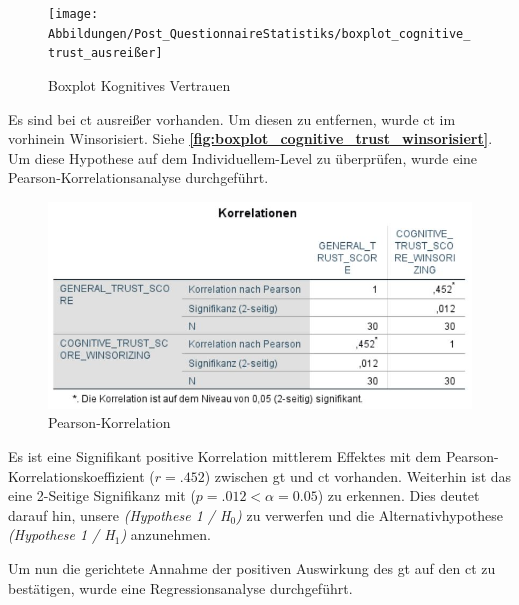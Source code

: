 \documentclass[a4paper,11pt]{article}%
\renewcommand{\\}{\vspace*{0.5\baselineskip} \newline}
\begin{document}
\begin{figure}[H]
\centering
		\begin{footnotesize}
			\texttt{[image: Abbildungen/Post\_QuestionnaireStatistiks/boxplot\_cognitive\_trust\_ausreißer]}\\
			\caption{Boxplot Kognitives Vertrauen}
			\label{fig:boxplot_cognitive_trust_ausreißer}
		\end{footnotesize}
	\end{figure}	

Es sind bei \ac{ct} ausreißer vorhanden. Um diesen zu entfernen, wurde \ac{ct} im vorhinein Winsorisiert. Siehe \textbf{\autoref{fig:boxplot_cognitive_trust_winsorisiert}}. 
Um diese Hypothese auf dem Individuellem-Level zu überprüfen, wurde eine Pearson-Korrelationsanalyse durchgeführt. 

\begin{figure}[H]
\centering
		\begin{footnotesize}
			\includegraphics[scale=0.8]{Abbildungen/Post_QuestionnaireStatistiks/pearson_korrelation_general_cognitive}\\
			\caption{Pearson-Korrelation}
			\label{fig:pearson_korrelation}
		\end{footnotesize}
	\end{figure}	

Es ist eine Signifikant positive Korrelation mittlerem Effektes mit dem Pearson-Korrelationskoeffizient ($r = .452$) zwischen \ac{gt} und \ac{ct} vorhanden. Weiterhin ist das eine 2-Seitige Signifikanz mit ($p = .012 < \alpha = 0.05$) zu erkennen. Dies deutet darauf hin, unsere \textit{(Hypothese 1 / H$_{0}$)} zu verwerfen und die Alternativhypothese \textit{(Hypothese 1 / H$_{1}$)} anzunehmen.

Um nun die gerichtete Annahme der positiven Auswirkung des \ac{gt} auf den \ac{ct} zu bestätigen, wurde eine Regressionsanalyse durchgeführt.
\end{document}
